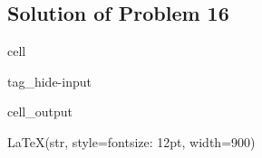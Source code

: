 \documentclass[letterpaper,10pt,english]{jupyterBook}
\begin{document}
\subsection{Solution of Problem 16}
\label{\detokenize{content/tutorials/T6/tutorial_06:solution-of-problem-16}}
\begin{sphinxuseclass}{cell}
\begin{sphinxuseclass}{tag_hide-input}\begin{sphinxVerbatimOutput}

\begin{sphinxuseclass}{cell_output}
\begin{sphinxVerbatim}[commandchars=\\\{\}]
LaTeX(str, style=\PYGZob{}\PYGZsq{}font\PYGZhy{}size\PYGZsq{}: \PYGZsq{}12pt\PYGZsq{}\PYGZcb{}, width=900)
\end{sphinxVerbatim}

\end{sphinxuseclass}\end{sphinxVerbatimOutput}

\end{sphinxuseclass}
\end{sphinxuseclass}
\end{document}
